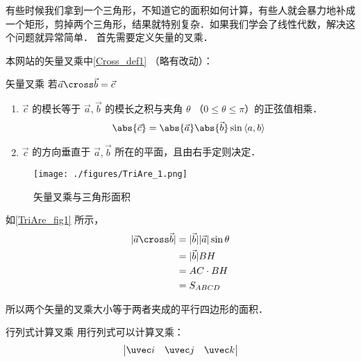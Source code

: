 

有些时候我们拿到一个三角形，不知道它的面积如何计算，有些人就会暴力地补成一个矩形，剪掉两个三角形，结果就特别复杂．如果我们学会了线性代数，解决这个问题就异常简单．
首先需要定义矢量的叉乘．

本网站的矢量叉乘中\autoref{Cross_def1} （略有改动）：
\begin{definition}{矢量叉乘} \label{TriAre_def1}
若$\vec a \cross \vec b = \vec c $
\begin{enumerate}s
\item $\vec c$ 的模长等于 $\vec a, \vec b$ 的模长之积与夹角 $\theta$ （$0 \leqslant \theta \leqslant \pi$）的正弦值相乘．
\begin{equation}\label{TriAre_eq1}
\abs{\vec c}  = \abs{\vec a} \abs{\vec b} \sin\left<a, b \right>
\end{equation}
\item $\vec c$ 的方向垂直于 $\vec a, \vec b$ 所在的平面，且由右手定则决定．
\end{enumerate}
\end{definition}
\begin{figure}[ht]
\centering
\texttt{[image: ./figures/TriAre\_1.png]}
\caption{矢量叉乘与三角形面积} \label{TriAre_fig1}
\end{figure}
如\autoref{TriAre_fig1} 所示，
\begin{equation}
\begin{aligned}
\lvert\vec a \cross \vec b\rvert &= \lvert\vec b\rvert \lvert\vec a\rvert\sin\theta \\
&= \lvert\vec b\rvert BH \\
&= AC \cdot BH \\
&= S_{ABCD}
\end{aligned}
\end{equation}

所以两个矢量的叉乘大小等于两者夹成的平行四边形的面积．
\begin{lemma}{行列式计算叉乘}
用行列式可以计算叉乘：
$$\begin{vmatrix}
\uvec i & \uvec j & \uvec k \\

\end{vmatrix}$$
\end{lemma}
